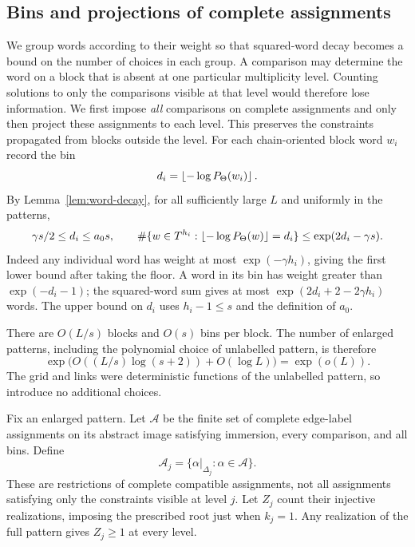 \subsection{Bins and projections of complete assignments}

We group words according to their weight so that squared-word decay becomes a bound on the number of choices in each group. A comparison may determine the word on a block that is absent at one particular multiplicity level. Counting solutions to only the comparisons visible at that level would therefore lose information. We first impose \emph{all} comparisons on complete assignments and only then project these assignments to each level. This preserves the constraints propagated from blocks outside the level.
For each chain-oriented block word $w_i$ record the bin
\[
 d_i=\left\lfloor -\log P_\Theta(w_i)\right\rfloor.
\]
By Lemma~\ref{lem:word-decay}, for all sufficiently large $L$ and uniformly in the patterns,
\begin{equation}\label{eq:bins}
 \gamma s/2\le d_i\le a_0s,
 \qquad
 \#\{w\in T^{h_i}:\left\lfloor -\log P_\Theta(w)\right\rfloor=d_i\}
 \le\exp(2d_i-\gamma s).
\end{equation}
Indeed any individual word has weight at most $\exp(-\gamma h_i)$, giving the first lower bound after taking the floor. A word in its bin has weight greater than $\exp(-d_i-1)$; the squared-word sum gives at most $\exp(2d_i+2-2\gamma h_i)$ words. The upper bound on $d_i$ uses $h_i-1\le s$ and the definition of $a_0$.

There are $O(L/s)$ blocks and $O(s)$ bins per block. The number of enlarged patterns, including the polynomial choice of unlabelled pattern, is therefore
\begin{equation}\label{eq:enlarged-patterns}
 \exp\bigl(O((L/s)\log(s+2))+O(\log L)\bigr)=\exp(o(L)).
\end{equation}
The grid and links were deterministic functions of the unlabelled pattern, so introduce no additional choices.

Fix an enlarged pattern. Let $\mathcal A$ be the finite set of complete edge-label assignments on its abstract image satisfying immersion, every comparison, and all bins. Define
\[
 \mathcal A_j=\{\alpha|_{\Delta_j}:\alpha\in\mathcal A\}.
\]
These are restrictions of complete compatible assignments, not all assignments satisfying only the constraints visible at level $j$. Let $Z_j$ count their injective realizations, imposing the prescribed root just when $k_j=1$. Any realization of the full pattern gives $Z_j\ge1$ at every level.

